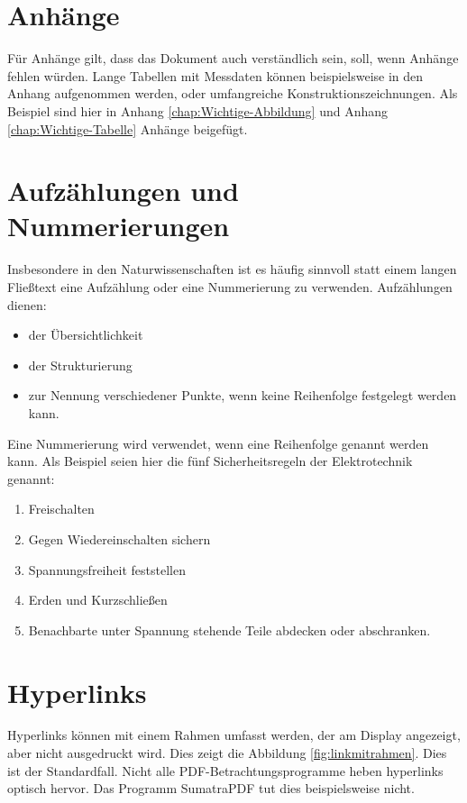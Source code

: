 
\chapter{Anhänge}

Für Anhänge gilt, dass das Dokument auch verständlich sein, soll,
wenn Anhänge fehlen würden. Lange Tabellen mit Messdaten können beispielsweise
in den Anhang aufgenommen werden, oder umfangreiche Konstruktionszeichnungen.
Als Beispiel sind hier in Anhang \ref{chap:Wichtige-Abbildung} und
Anhang \ref{chap:Wichtige-Tabelle} Anhänge beigefügt.

\chapter{Aufzählungen und Nummerierungen}

Insbesondere in den Naturwissenschaften ist es häufig sinnvoll statt
einem langen Fließtext eine Aufzählung oder eine Nummerierung zu verwenden.
Aufzählungen dienen:
\begin{itemize}
\item der Übersichtlichkeit
\item der Strukturierung
\item zur Nennung verschiedener Punkte, wenn keine Reihenfolge festgelegt
werden kann.
\end{itemize}
Eine Nummerierung wird verwendet, wenn eine Reihenfolge genannt werden
kann. Als Beispiel seien hier die fünf Sicherheitsregeln der Elektrotechnik
genannt:
\begin{enumerate}
\item Freischalten
\item Gegen Wiedereinschalten sichern
\item Spannungsfreiheit feststellen
\item Erden und Kurzschließen
\item Benachbarte unter Spannung stehende Teile abdecken oder abschranken.
\end{enumerate}

\chapter{Hyperlinks}

Hyperlinks können mit einem Rahmen umfasst werden, der am Display
angezeigt, aber nicht ausgedruckt wird. Dies zeigt die Abbildung \ref{fig:linkmitrahmen}.
Dies ist der Standardfall. Nicht alle PDF-Betrachtungsprogramme heben
hyperlinks optisch hervor. Das Programm SumatraPDF tut dies beispielsweise
nicht.

